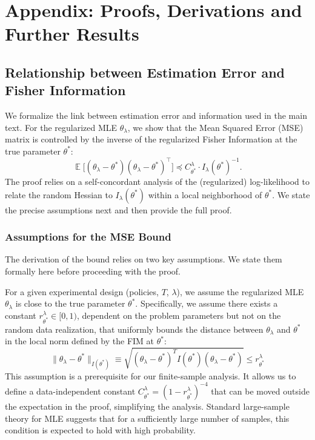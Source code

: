 \documentclass{article}
\DeclareMathOperator*{\E}{\mathbb{E}} %
\begin{document}
\section{Appendix: Proofs, Derivations and Further Results}
\label{sec:appendix_detailed_results}

\subsection{Relationship between Estimation Error and Fisher Information}
\label{sec:appendix_mse_derivation}

We formalize the link between estimation error and information used in the main text. For the regularized MLE $\theta_\lambda$, we show that the Mean Squared Error (MSE) matrix is controlled by the inverse of the regularized Fisher Information at the true parameter $\theta^*$:
\[ \E\big[(\theta_\lambda-\theta^*)(\theta_\lambda-\theta^*)^\top\big] \preceq C^{\lambda}_{\theta^*} \cdot I_\lambda(\theta^*)^{-1}. \]
The proof relies on a self-concordant analysis of the (regularized) log-likelihood to relate the random Hessian to $I_\lambda(\theta^*)$ within a local neighborhood of $\theta^*$. We state the precise assumptions next and then provide the full proof.

\subsubsection{Assumptions for the MSE Bound}

The derivation of the bound relies on two key assumptions. We state them formally here before proceeding with the proof.

\begin{assumption}
\label{assum:local_consistency}
For a given experimental design (policies, $T$, $\lambda$), we assume the regularized MLE $\theta_\lambda$ is close to the true parameter $\theta^*$. Specifically, we assume there exists a constant $r^{\lambda}_{\theta^*} \in [0, 1)$, dependent on the problem parameters but not on the random data realization, that uniformly bounds the distance between $\theta_\lambda$ and $\theta^*$ in the local norm defined by the FIM at $\theta^*$:
\[ \|\theta_\lambda - \theta^*\|_{I(\theta^*)} \equiv \sqrt{(\theta_\lambda - \theta^*)^T I(\theta^*) (\theta_\lambda - \theta^*)} \le r^{\lambda}_{\theta^*} \]
This assumption is a prerequisite for our finite-sample analysis. It allows us to define a data-independent constant $C^{\lambda}_{\theta^*}=(1-r^{\lambda}_{\theta^*})^{-4}$ that can be moved outside the expectation in the proof, simplifying the analysis. Standard large-sample theory for MLE suggests that for a sufficiently large number of samples, this condition is expected to hold with high probability.
\end{assumption}
\end{document}
